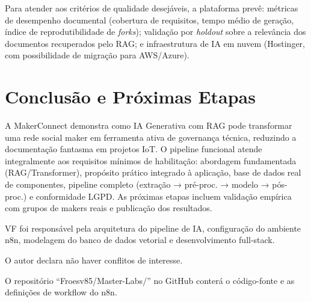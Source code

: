 \documentclass[portuguese]{sbcreviews-2025}%
\begin{document}
Para atender aos critérios de qualidade desejáveis, a plataforma prevê: métricas de desempenho documental (cobertura de requisitos, tempo médio de geração, índice de reprodutibilidade de \textit{forks}); validação por \textit{holdout} sobre a relevância dos documentos recuperados pelo RAG; e infraestrutura de IA em nuvem (Hostinger, com possibilidade de migração para AWS/Azure).

\section{Conclusão e Próximas Etapas}

A MakerConnect demonstra como IA Generativa com RAG pode transformar uma rede social maker em ferramenta ativa de governança técnica, reduzindo a documentação fantasma em projetos IoT. O pipeline funcional atende integralmente aos requisitos mínimos de habilitação: abordagem fundamentada (RAG/Transformer), propósito prático integrado à aplicação, base de dados real de componentes, pipeline completo (extração → pré-proc. → modelo → pós-proc.) e conformidade LGPD. As próximas etapas incluem validação empírica com grupos de makers reais e publicação dos resultados.

\begin{declarations}
\begin{contributions}
VF foi responsável pela arquitetura do pipeline de IA, configuração do ambiente n8n, modelagem do banco de dados vetorial e desenvolvimento full-stack.
\end{contributions}
\begin{interests}
O autor declara não haver conflitos de interesse.
\end{interests}
\begin{materials}
O repositório ``Froesv85/Master-Labs/'' no GitHub conterá o código-fonte e as definições de workflow do n8n.
\end{materials}
\end{declarations}



\end{document}

